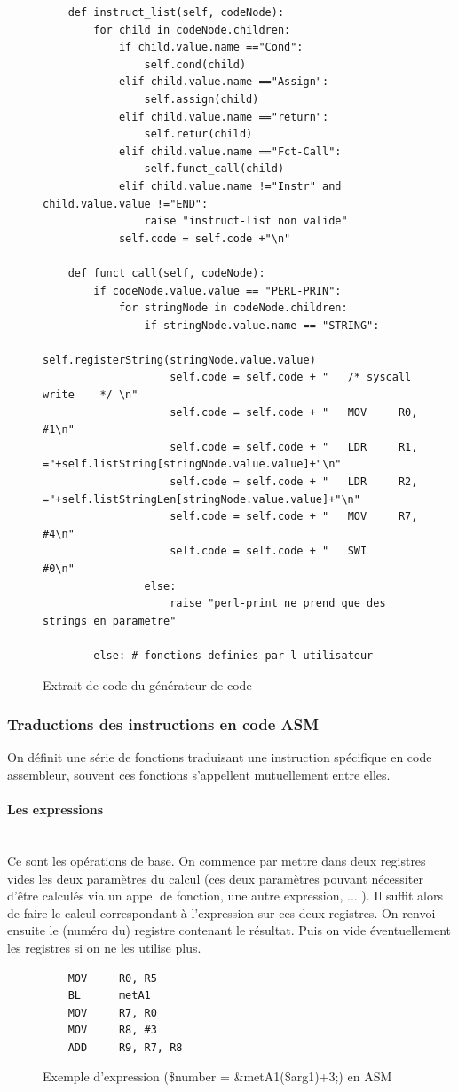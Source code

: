 \documentclass[a4paper,10pt]{article}
\begin{document}
	\begin{figure}[H]
\begin{lstlisting}
	def instruct_list(self, codeNode):
		for child in codeNode.children:
			if child.value.name =="Cond":
				self.cond(child)
			elif child.value.name =="Assign":
				self.assign(child)
			elif child.value.name =="return":
				self.retur(child)
			elif child.value.name =="Fct-Call":
				self.funct_call(child)
			elif child.value.name !="Instr" and child.value.value !="END":
				raise "instruct-list non valide"
			self.code = self.code +"\n"
				
	def funct_call(self, codeNode):
		if codeNode.value.value == "PERL-PRIN":
			for stringNode in codeNode.children:
				if stringNode.value.name == "STRING":
					self.registerString(stringNode.value.value)
					self.code = self.code + "	/* syscall write	*/ \n"
					self.code = self.code + "	MOV 	R0, #1\n"
					self.code = self.code + "	LDR 	R1, ="+self.listString[stringNode.value.value]+"\n"
					self.code = self.code + "	LDR 	R2, ="+self.listStringLen[stringNode.value.value]+"\n"
					self.code = self.code + "	MOV 	R7, #4\n"
					self.code = self.code + "	SWI 	#0\n"
				else:
					raise "perl-print ne prend que des strings en parametre"
			
		else: # fonctions definies par l utilisateur
\end{lstlisting}
\fontfamily{}
\caption{Extrait de code du générateur de code}
\label{lst:codeGeneration}
\end{figure}


	\subsubsection{Traductions des instructions en code ASM}
		On définit une série de fonctions traduisant une instruction spécifique en code assembleur, souvent ces fonctions s'appellent mutuellement entre elles.\\
		\paragraph{Les expressions}~\\
			Ce sont les opérations de base. On commence par mettre dans deux registres vides les deux paramètres du calcul (ces deux paramètres pouvant nécessiter d'être calculés via un appel de fonction, une autre expression, ... ). Il suffit alors de faire le calcul correspondant à l'expression sur ces deux registres. On renvoi ensuite le (numéro du) registre contenant le résultat. Puis on vide éventuellement les registres si on ne les utilise plus.
				\begin{figure}[H]
\begin{lstlisting}
	MOV 	R0, R5 		
	BL		metA1		
	MOV 	R7, R0		
	MOV 	R8, #3		
	ADD		R9, R7, R8	
\end{lstlisting}
\fontfamily{}
\caption{Exemple d'expression (\$number = \&metA1(\$arg1)+3;) en ASM}
\label{lst:ExExpression}
\end{figure}
\end{document}
